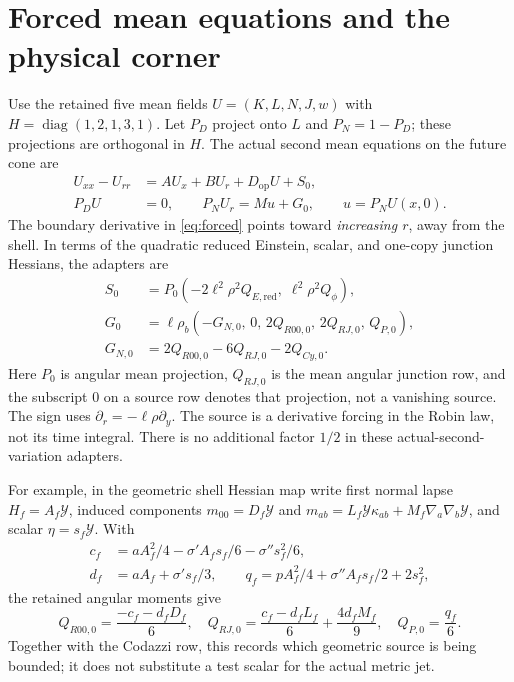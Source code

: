 \documentclass[11pt]{article}
\newcommand{\PN}{P_{\!N}}
\newcommand{\PD}{P_{\!D}}
\newcommand{\Dmat}{D_{\mathrm{op}}}
\begin{document}
\section{Forced mean equations and the physical corner}
\label{sec:forced}
Use the retained five mean fields $U=(K,L,N,J,w)$ with
$H=\operatorname{diag}(1,2,1,3,1)$. Let $\PD$ project onto $L$ and
$\PN=1-\PD$; these projections are orthogonal in $H$. The actual second
mean equations on the future cone are
\begin{equation}
\begin{aligned}
 U_{xx}-U_{rr}&=A U_x+B U_r+\Dmat U+S_0,\\
 \PD U&=0,\qquad \PN U_r=M u+G_0,\qquad
 u=\PN U(x,0).
\end{aligned}
\label{eq:forced}
\end{equation}
The boundary derivative in \eqref{eq:forced} points toward
\emph{increasing $r$}, away from the shell. In terms of the quadratic
reduced Einstein, scalar, and one-copy junction Hessians, the adapters are
\begin{equation}
\begin{aligned}
 S_0&=P_0(-2\ell^2\rho^2 Q_{E,\mathrm{red}},\;\ell^2\rho^2 Q_\phi),\\
 G_0&=\ell\rho_b(-G_{N,0},\,0,\,2Q_{R00,0},\,
                         2Q_{RJ,0},\,Q_{P,0}),\\
 G_{N,0}&=2Q_{R00,0}-6Q_{RJ,0}-2Q_{Cy,0}.
\end{aligned}
\label{eq:adapters}
\end{equation}
Here $P_0$ is angular mean projection, $Q_{RJ,0}$ is the mean angular
junction row, and the subscript $0$ on a source row denotes that projection,
not a vanishing source. The sign uses $\partial_r=-\ell\rho\partial_y$.
The source is a derivative forcing in the Robin law, not its time integral.
There is no additional factor $1/2$ in these actual-second-variation
adapters.

For example, in the geometric shell Hessian map write first normal lapse
$H_f=A_f\mathcal Y$, induced components
$m_{00}=D_f\mathcal Y$ and
$m_{ab}=L_f\mathcal Y\kappa_{ab}+M_f\nabla_a\nabla_b\mathcal Y$,
and scalar $\eta=s_f\mathcal Y$. With
\begin{equation}
\begin{aligned}
 c_f&=aA_f^2/4-\sigma'A_fs_f/6-\sigma''s_f^2/6,\\
 d_f&=aA_f+\sigma's_f/3,\qquad
 q_f=pA_f^2/4+\sigma''A_fs_f/2+2s_f^2,
\end{aligned}
\end{equation}
the retained angular moments give
\begin{equation}
 Q_{R00,0}=\frac{-c_f-d_fD_f}{6},\quad
 Q_{RJ,0}=\frac{c_f-d_fL_f}{6}+\frac{4d_fM_f}{9},
 \quad Q_{P,0}=\frac{q_f}{6}.
\end{equation}
Together with the Codazzi row, this records which geometric source is being
bounded; it does not substitute a test scalar for the actual metric jet.
\end{document}
